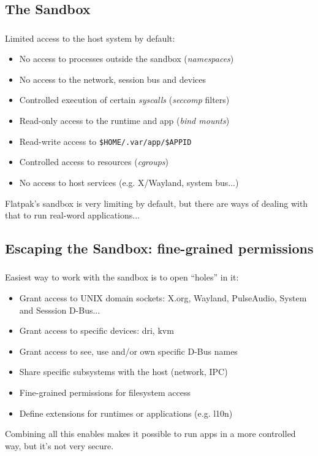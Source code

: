\subsection{The Sandbox}
\begin{frame}
  \frametitle{\insertsubsection}

  Limited access to the host system by default:
    \begin{itemize}
    \item No access to processes outside the sandbox (\textit{namespaces})\vspacing
    \item No access to the network, session bus and devices\vspacing
    \item Controlled execution of certain \textit{syscalls} (\textit{seccomp} filters)\vspacing
    \item Read-only access to the runtime and app (\textit{bind mounts})\vspacing
    \item Read-write access to \texttt{\$HOME/.var/app/\$APPID}\vspacing
    \item Controlled access to resources (\textit{cgroups})\vspacing
    \item No access to host services (e.g. X/Wayland, system bus...)
    \end{itemize}

    \begin{flushleft}
      Flatpak's sandbox is very limiting by default, but there are ways of dealing with that to run real-word applications...
    \end{flushleft}
\end{frame}

\subsection{Escaping the Sandbox: fine-grained permissions}
\begin{frame}[fragile]
  \frametitle{\insertsubsection}

  Easiest way to work with the sandbox is to open ``holes'' in it:
    \begin{itemize}
    \item Grant access to UNIX domain sockets: X.org, Wayland, PulseAudio, System and Sesssion D-Bus...\vspacing
    \item Grant access to specific devices: dri, kvm\vspacing
    \item Grant access to see, use and/or own specific D-Bus names\vspacing
    \item Share specific subsystems with the host (network, IPC)\vspacing
    \item Fine-grained permissions for filesystem access\vspacing
    \item Define extensions for runtimes or applications (e.g. l10n)
    \end{itemize}

    \begin{flushleft}
      Combining all this enables makes it possible to run apps in a more controlled way, but it's not very secure.
    \end{flushleft}
\end{frame}

